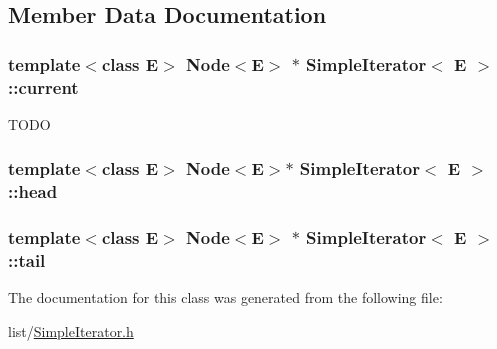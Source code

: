 \subsection{Member Data Documentation}
\hypertarget{class_simple_iterator_a7777fefe265a5067ec9319d8c1a3e278}{
\subsubsection[{current}]{\setlength{\rightskip}{0pt plus 5cm}template$<$class E$>$ {\bf Node}$<$E$>$ $\ast$ {\bf Simple\-Iterator}$<$ E $>$\-::current\hspace{0.3cm}{\ttfamily [protected]}}}\label{class_simple_iterator_a7777fefe265a5067ec9319d8c1a3e278}
T\-O\-D\-O \hypertarget{class_simple_iterator_a0403100ab86dba958115cea4147508a7}{
\subsubsection[{head}]{\setlength{\rightskip}{0pt plus 5cm}template$<$class E$>$ {\bf Node}$<$E$>$$\ast$ {\bf Simple\-Iterator}$<$ E $>$\-::head\hspace{0.3cm}{\ttfamily [protected]}}}\label{class_simple_iterator_a0403100ab86dba958115cea4147508a7}
\hypertarget{class_simple_iterator_a9bfb7d6c12bc1e8031b5c0869026415a}{
\subsubsection[{tail}]{\setlength{\rightskip}{0pt plus 5cm}template$<$class E$>$ {\bf Node}$<$E$>$ $\ast$ {\bf Simple\-Iterator}$<$ E $>$\-::tail\hspace{0.3cm}{\ttfamily [protected]}}}\label{class_simple_iterator_a9bfb7d6c12bc1e8031b5c0869026415a}


The documentation for this class was generated from the following file\-:\begin{DoxyCompactItemize}
\item 
list/\hyperlink{_simple_iterator_8h}{Simple\-Iterator.\-h}\end{DoxyCompactItemize}
